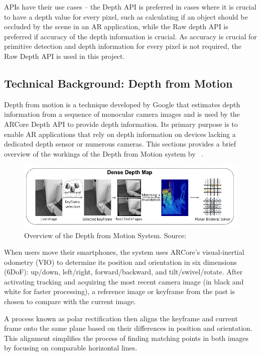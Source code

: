 APIs have their use cases --
the Depth API is preferred in cases where it is crucial to have a depth value for every pixel, such as calculating if an object should be occluded by the scene in an AR application,
while the Raw depth API is preferred if accuracy of the depth information is crucial.
As accuracy is crucial for primitive detection and depth information for every pixel is not required, the Raw Depth API is used in this project.

\subsection{Technical Background: Depth from Motion}\label{sec:technical-background-depth-from-motion}
Depth from motion is a technique developed by Google that estimates depth information from a sequence of monocular camera images
and is used by the ARCore Depth API to provide depth information.
Its primary purpose is to enable AR applications that rely on depth information on devices lacking a dedicated depth sensor or numerous cameras.
This sections provides a brief overview of the workings of the Depth from Motion system by ~\parencite{valentin_depth_2018}.

\begin{figure}[ht!]
    \centering
    \includegraphics[width=\linewidth]{images/DepthFromMotion}
    \caption{Overview of the Depth from Motion System. Source: \cite{valentin_depth_2018}}
\end{figure}
When users move their smartphones, the system uses ARCore's visual-inertial odometry (VIO)
to determine its position and orientation in six dimensions (6DoF): up/down, left/right, forward/backward, and tilt/swivel/rotate.
After activating tracking and acquiring the most recent camera image (in black and white for faster processing),
a reference image or keyframe from the past is chosen to compare with the current image.

A process known as polar rectification then aligns the keyframe and current frame onto the same plane based on their differences in position and orientation.
This alignment simplifies the process of finding matching points in both images by focusing on comparable horizontal lines.

